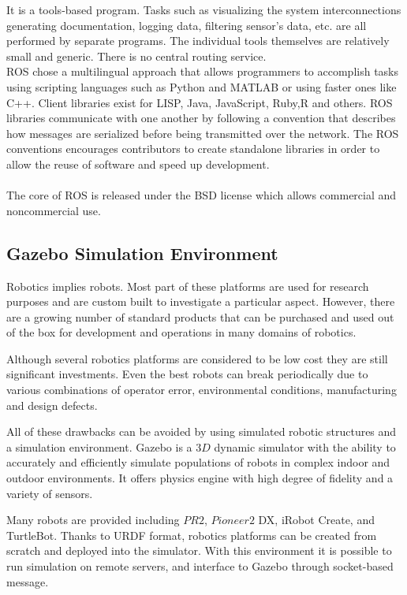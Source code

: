 It is a tools-based program. Tasks such as visualizing the system interconnections generating documentation, logging data, filtering sensor's data, etc. are all performed by separate programs. The individual tools themselves are relatively small and generic. There is no central routing service.
\\
ROS chose a multilingual approach that allows programmers to accomplish tasks using scripting languages such as Python and MATLAB or using faster ones like C++. Client libraries exist for LISP, Java, JavaScript, Ruby,R and others. ROS libraries communicate with one another by following a convention that describes how messages are serialized before being transmitted over the network. The ROS conventions encourages contributors to create standalone libraries in order to allow the reuse of software and speed up development.\\
\\
The core of ROS is released under the BSD license which allows commercial and noncommercial use.

\subsection{Gazebo Simulation Environment}

Robotics implies robots. Most part of these platforms are used for research purposes and are custom built to investigate a particular aspect. However, there are a growing number of standard products that can be purchased and used out of the box for development and operations in many domains of robotics.

Although several robotics platforms are considered to be low cost they are still significant investments. Even the best robots can break periodically due to various combinations of operator error, environmental conditions, manufacturing and design defects.

All of these drawbacks can be avoided by using simulated robotic structures and a simulation environment. Gazebo is a $3D$ dynamic simulator with the ability to accurately and efficiently simulate populations of robots in complex indoor and outdoor environments. It offers physics engine with high degree of fidelity and a variety of sensors.

Many robots are provided including $PR2$, $Pioneer2$ DX, iRobot Create, and TurtleBot. Thanks to URDF format, robotics platforms can be created from scratch and deployed into the simulator.
With this environment it is possible to run simulation on remote servers, and interface to Gazebo through socket-based message.

